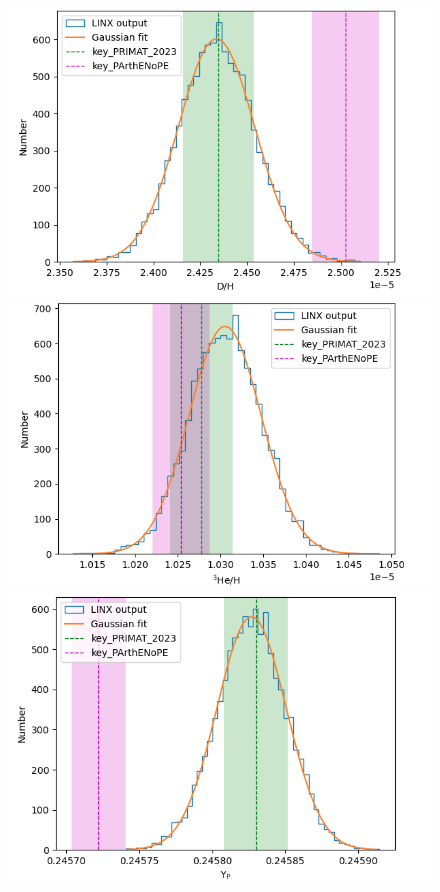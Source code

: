 \documentclass[%
 reprint,
superscriptaddress,
nofootinbib,
 amsmath,amssymb,
 aps,
 pra,
]{revtex4-2}
\begin{document}
\begin{figure}
	\centering
	\begin{minipage}{0.32\textwidth}
		\centering
		\includegraphics[width=\linewidth]{Figures/dd_theory_dh.png}
	\end{minipage}
	\hspace{0mm}
	\begin{minipage}{0.32\textwidth}
		\centering
		\includegraphics[width=\linewidth]{Figures/dd_theory_he3h.png}
	\end{minipage}
	\hspace{0mm}
	\begin{minipage}{0.32\textwidth}
		\centering
		\includegraphics[width=\linewidth]{Figures/dd_theory_yp.png}

\end{minipage}
\end{figure}
\end{document}
